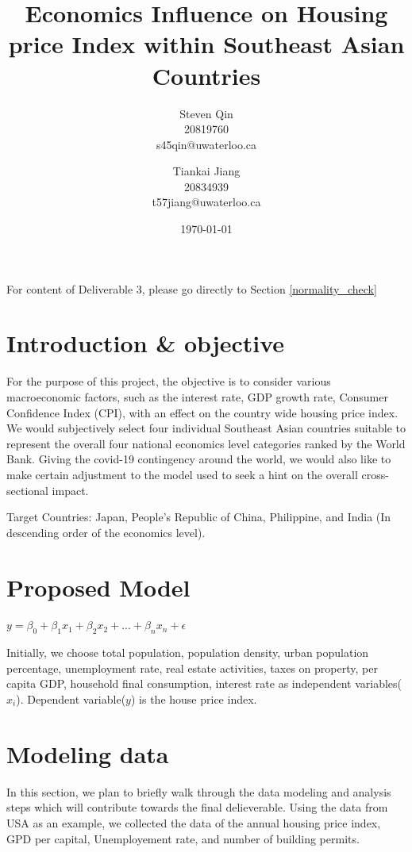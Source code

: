 \documentclass[11pt]{article}
\title{Economics Influence on Housing price Index within Southeast Asian Countries}
\author{Steven Qin\\20819760\\s45qin@uwaterloo.ca \and Tiankai Jiang\\20834939\\t57jiang@uwaterloo.ca}
\date{\today}
\begin{document}
\maketitle

For content of Deliverable 3, please go directly to Section \ref{normality_check}

\section{Introduction \& objective}\label{section-introduction}
For the purpose of this project, the objective is to consider various macroeconomic factors, such as the interest rate, GDP growth rate, Consumer Confidence Index (CPI), with an effect on the country wide housing price index. We would subjectively select four individual Southeast Asian countries suitable to represent the overall four national economics level categories ranked by the World Bank. Giving the covid-19 contingency around the world, we would also like to make certain adjustment to the model used to seek a hint on the overall cross-sectional impact.

Target Countries: Japan, People’s Republic of China, Philippine, and India (In descending order of the economics level).

\section{Proposed Model}\label{section-proposedmodel}
$y = \beta_0 + \beta_1x_1 + \beta_2x_2 + ... + \beta_nx_n + \epsilon$

Initially, we choose total population, population density, urban population percentage, unemployment rate, real estate activities, taxes on property, per capita GDP, household final consumption, interest rate\citep{10.2307/23606731, 10.2139/ssrn.2431627, aei297454} as independent variables($x_i$). Dependent variable($y$) is the house price index.

\section{Modeling data}\label{section-proposedmodel}
In this section, we plan to briefly walk through the data modeling and analysis steps which will contribute towards the final delieverable. Using the data from USA as an example, we collected the data of the annual housing price index, GPD per capital, Unemployement rate, and number of building permits.
\end{document}
